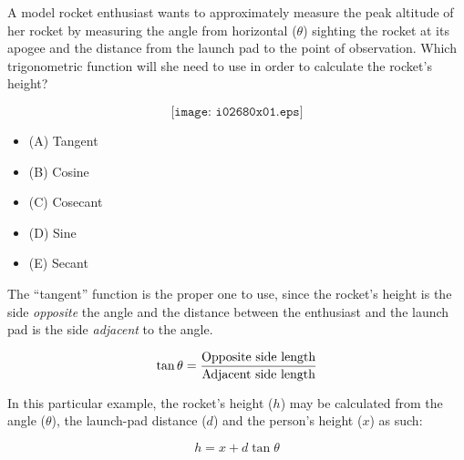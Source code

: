 

A model rocket enthusiast wants to approximately measure the peak altitude of her rocket by measuring the angle from horizontal ($\theta$) sighting the rocket at its apogee and the distance from the launch pad to the point of observation.  Which trigonometric function will she need to use in order to calculate the rocket's height?

$$\texttt{[image: i02680x01.eps]}$$

\begin{itemize}
\item{(A)} Tangent
\vskip 5pt 
\item{(B)} Cosine
\vskip 5pt 
\item{(C)} Cosecant
\vskip 5pt 
\item{(D)} Sine
\vskip 5pt 
\item{(E)} Secant
\end{itemize}







The ``tangent'' function is the proper one to use, since the rocket's height is the side {\it opposite} the angle and the distance between the enthusiast and the launch pad is the side {\it adjacent} to the angle.

$$\tan \theta = {\hbox{Opposite side length} \over \hbox{Adjacent side length}}$$

In this particular example, the rocket's height ($h$) may be calculated from the angle ($\theta$), the launch-pad distance ($d$) and the person's height ($x$) as such:

$$h = x + d \tan \theta$$
 










